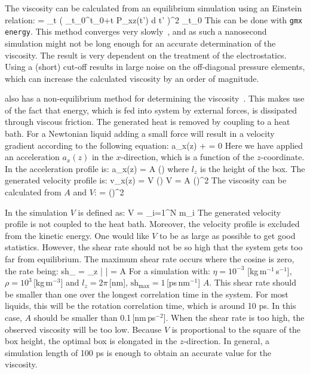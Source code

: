 The viscosity can be calculated from an equilibrium simulation using
an Einstein relation:
\beq
\eta =  \lim_{t \rightarrow \infty}
 \left\langle 
\left( \int_{t_0}^{{t_0}+t} P_{xz}(t') \mbox{d} t' \right)^2
\right\rangle_{t_0}
\eeq
This can be done with {\tt gmx energy}.
This method converges very slowly~\cite{Hess2002a}, and as such
a nanosecond simulation might not
be long enough for an accurate determination of the viscosity.
The result is very dependent on the treatment of the electrostatics.
Using a (short) cut-off results in large noise on the off-diagonal
pressure elements, which can increase the calculated viscosity by an order
of magnitude.

{\gromacs} also has a non-equilibrium method for determining
the viscosity~\cite{Hess2002a}.
This makes use of the fact that energy, which is fed into system by
external forces, is dissipated through viscous friction. The generated heat
is removed by coupling to a heat bath. For a Newtonian liquid adding a 
small force will result in a velocity gradient according to the following
equation:
\beq
a_x(z) + \frac{\eta}{\rho}  = 0
\eeq
Here we have applied an acceleration $a_x(z)$ in the $x$-direction, which
is a function of the $z$-coordinate.
In {\gromacs} the acceleration profile is:
\beq
a_x(z) = A \cos\left(\right)
\eeq
where $l_z$ is the height of the box. The generated velocity profile is:
\beq
v_x(z) = V \cos\left(\right)
\eeq
\beq
V = A \frac{\rho}{\eta}\left(\right)^2
\eeq
The viscosity can be calculated from $A$ and $V$:
\beq
\label{visc}
\eta = \rho \left(\right)^2
\eeq

In the simulation $V$ is defined as:
\beq
V = 
         {\displaystyle \sum_{i=1}^N m_i}
\eeq
The generated velocity profile is not coupled to the heat bath. Moreover,
the velocity profile is excluded from the kinetic energy.
One would like $V$ to be as large as possible to get good statistics.
However, the shear rate should not be so high that the system gets too far
from equilibrium. The maximum shear rate occurs where the cosine is zero,
the rate being:
\beq
\mbox{sh}_{\max} =  \max_z \left|  \right|
= A \frac{\rho}{\eta} 
\eeq
For a simulation with: $\eta=10^{-3}$ [kg\,m$^{-1}$\,s$^{-1}$],
$\rho=10^3$\,[kg\,m$^{-3}$] and $l_z=2\pi$\,[nm],
$\mbox{sh}_{\max}=1$\,[ps\,nm$^{-1}$] $A$.
This shear rate should be smaller than one over the longest
correlation time in the system. For most liquids, this will be the rotation
correlation time, which is around 10 ps. In this case, $A$ should
be smaller than 0.1\,[nm\,ps$^{-2}$].
When the shear rate is too high, the observed viscosity will be too low.
Because $V$ is proportional to the square of the box height,
the optimal box is elongated in the $z$-direction.
In general, a simulation length of 100 ps is enough to obtain an
accurate value for the viscosity.

